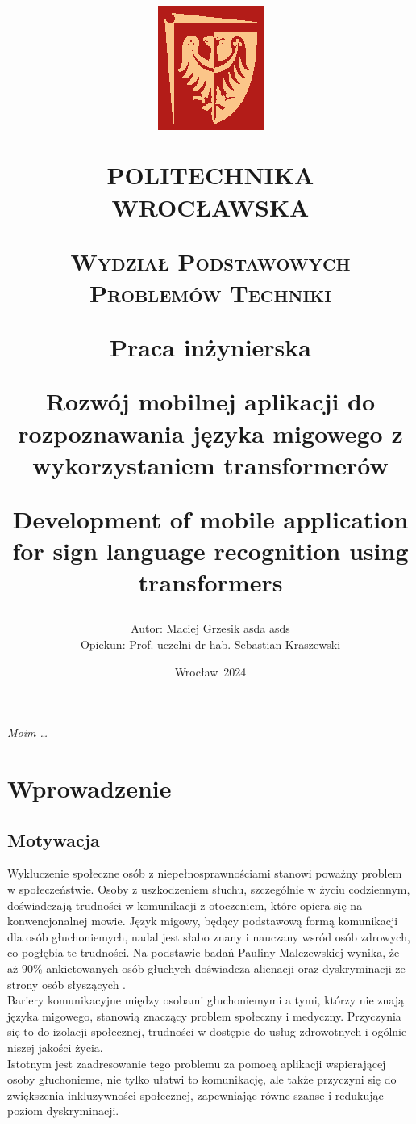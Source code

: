 \documentclass[12pt,a4paper,twoside]{book} %
\title
    {
    \vspace{-2.5cm}
        {\includegraphics[width=.215\textwidth]{figs/PWrLogo.eps}} \par \vspace{1ex} \large{POLITECHNIKA WROCŁAWSKA} 
	\par \vspace{1ex}
	{\scshape\large Wydział Podstawowych Problemów Techniki\par}
	\vspace{2cm}
    {Praca inżynierska\par}  %
    \vspace{2cm}
	{\Large{\bf Rozwój mobilnej aplikacji do rozpoznawania języka migowego z wykorzystaniem transformerów}\par}
    {Development of mobile application for sign language recognition using transformers}
    }
\author
    {
    \vspace{1cm}
    Autor: Maciej Grzesik asda asds\\
    Opiekun: Prof. uczelni dr hab. Sebastian Kraszewski 
    }
\date{\vfill Wrocław~2024}
\begin{document}
\maketitle

\afterpage{\blankpage}\clearpage

\begin{flushright}
    \thispagestyle{empty}
    \vspace*{\fill}
    {
        \em Moim \dots
    }
\end{flushright}

\afterpage{\blankpage}\clearpage

{
  \hypersetup{linkcolor=black}
  \tableofcontents
}


\chapter{Wprowadzenie}\label{ch:intro}

\section{Motywacja}


Wykluczenie społeczne osób z niepełnosprawnościami stanowi poważny problem w społeczeństwie.
Osoby z uszkodzeniem słuchu, szczególnie w życiu codziennym, doświadczają trudności w komunikacji z otoczeniem, które opiera się na konwencjonalnej mowie.
Język migowy, będący podstawową formą komunikacji dla osób głuchoniemych, nadal jest słabo znany i nauczany wsród osób zdrowych, co pogłębia te trudności.
Na podstawie badań Pauliny Malczewskiej wynika, że aż 90\% ankietowanych osób głuchych doświadcza alienacji oraz dyskryminacji ze strony osób słyszących \cite{malczewska2011}. \\
Bariery komunikacyjne między osobami głuchoniemymi a tymi, którzy nie znają języka migowego, stanowią znaczący problem społeczny i medyczny. Przyczynia się to do izolacji społecznej, trudności w dostępie do usług zdrowotnych i ogólnie niszej jakości życia. \\
Istotnym jest zaadresowanie tego problemu za pomocą aplikacji wspierającej osoby głuchonieme, nie tylko ułatwi to komunikację, ale także przyczyni się do zwiększenia inkluzywności społecznej, zapewniając równe szanse i redukując poziom dyskryminacji.
\end{document}
